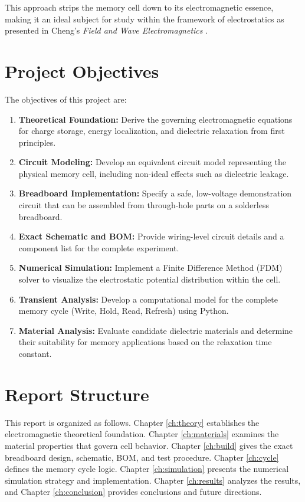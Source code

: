 \documentclass[12pt,a4paper]{report}
\begin{document}
This approach strips the memory cell down to its electromagnetic essence, making it an ideal subject for study within the framework of electrostatics as presented in Cheng's \textit{Field and Wave Electromagnetics} \cite{cheng}.

\section{Project Objectives}

The objectives of this project are:
\begin{enumerate}
    \item \textbf{Theoretical Foundation:} Derive the governing electromagnetic equations for charge storage, energy localization, and dielectric relaxation from first principles.
    \item \textbf{Circuit Modeling:} Develop an equivalent circuit model representing the physical memory cell, including non-ideal effects such as dielectric leakage.
    \item \textbf{Breadboard Implementation:} Specify a safe, low-voltage demonstration circuit that can be assembled from through-hole parts on a solderless breadboard.
    \item \textbf{Exact Schematic and BOM:} Provide wiring-level circuit details and a component list for the complete experiment.
    \item \textbf{Numerical Simulation:} Implement a Finite Difference Method (FDM) solver to visualize the electrostatic potential distribution within the cell.
    \item \textbf{Transient Analysis:} Develop a computational model for the complete memory cycle (Write, Hold, Read, Refresh) using Python.
    \item \textbf{Material Analysis:} Evaluate candidate dielectric materials and determine their suitability for memory applications based on the relaxation time constant.
\end{enumerate}

\section{Report Structure}

This report is organized as follows. Chapter \ref{ch:theory} establishes the electromagnetic theoretical foundation. Chapter \ref{ch:materials} examines the material properties that govern cell behavior. Chapter \ref{ch:build} gives the exact breadboard design, schematic, BOM, and test procedure. Chapter \ref{ch:cycle} defines the memory cycle logic. Chapter \ref{ch:simulation} presents the numerical simulation strategy and implementation. Chapter \ref{ch:results} analyzes the results, and Chapter \ref{ch:conclusion} provides conclusions and future directions.
\end{document}
